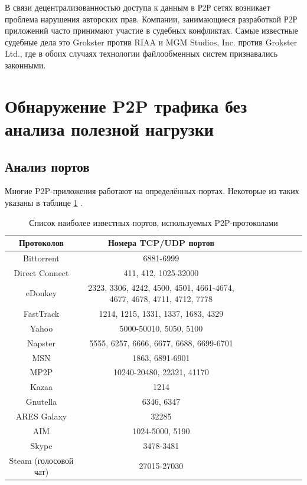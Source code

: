 \documentclass[bachelor, och, coursework]{SCWorks}
\begin{document}
В связи децентрализованностью доступа к данным в Р2Р сетях возникает проблема нарушения авторских прав. 
Компании, занимающиеся разработкой Р2Р приложений часто принимают участие в судебных конфликтах. 
Самые известные судебные дела это Grokster против RIAA и MGM Studios, Inc. против Grokster Ltd., 
где в обоих случаях технологии файлообменных систем признавались законными.

\section{Обнаружение P2P трафика без анализа полезной нагрузки}
\subsection{Анализ портов}
Многие P2P-приложения работают на определённых портах. 
Некоторые из таких указаны в таблице \ref{table:p2p-ports} \cite{p2p-list}.

\begin{table}[H]
    \caption{Список наиболее известных портов, используемых P2P-протоколами}
    \label{table:p2p-ports}
    \begin{center}
    {\small
    \begin{tabular}{|c|c|c|c|c|c|c|c|c|}
        \hline
    Протоколов   & Номера TCP/UDP портов \\ \hline
    Bittorrent      & 6881-6999  \\ \hline
    Direct Connect  & 411, 412, 1025-32000  \\ \hline
    eDonkey         & 2323, 3306, 4242, 4500, 4501, 4661-4674, 4677, 4678, 4711, 4712, 7778  \\ \hline
    FastTrack       & 1214, 1215, 1331, 1337, 1683, 4329  \\ \hline
    Yahoo           & 5000-50010, 5050, 5100  \\ \hline
    Napster         & 5555, 6257, 6666, 6677, 6688, 6699-6701  \\ \hline
    MSN             & 1863, 6891-6901 \\ \hline
    MP2P            & 10240-20480, 22321, 41170  \\ \hline
    Kazaa           & 1214  \\ \hline
    Gnutella        & 6346, 6347  \\ \hline
    ARES Galaxy     & 32285  \\ \hline
    AIM             & 1024-5000, 5190  \\ \hline
    Skype           & 3478-3481 \\ \hline
    Steam (голосовой чат) & 27015-27030 \\ \hline
    \end{tabular}
    }
    \end{center}
\end{table}
\end{document}
